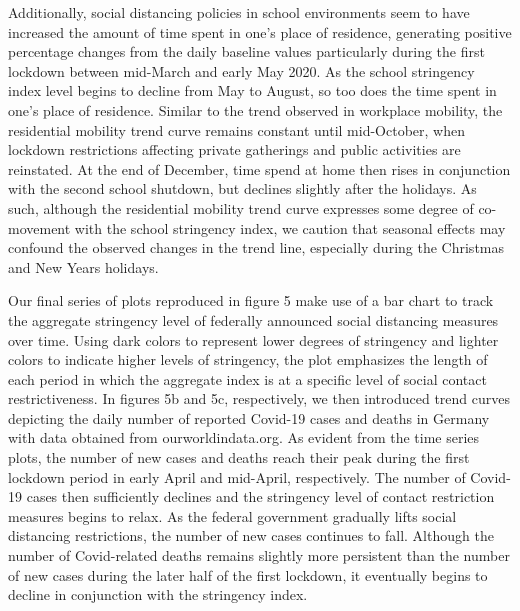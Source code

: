Additionally, social distancing policies in school environments seem to have increased the amount of time spent in one’s place of residence, generating positive percentage changes from the daily baseline values particularly during the first lockdown between mid-March and early May 2020. As the school stringency index level begins to decline from May to August, so too does the time spent in one’s place of residence. Similar to the trend observed in workplace mobility, the residential mobility trend curve remains constant until mid-October, when lockdown restrictions affecting private gatherings and public activities are reinstated. At the end of December, time spend at home then rises in conjunction with the second school shutdown, but declines slightly after the holidays. As such, although the residential mobility trend curve expresses some degree of co-movement with the school stringency index, we caution that seasonal effects may confound the observed changes in the trend line, especially during the Christmas and New Years holidays.

Our final series of plots reproduced in figure 5 make use of a bar chart to track the aggregate stringency level of federally announced social distancing measures over time. Using dark colors to represent lower degrees of stringency and lighter colors to indicate higher levels of stringency, the plot emphasizes the length of each period in which the aggregate index is at a specific level of social contact restrictiveness. In figures 5b and 5c, respectively, we then introduced trend curves depicting the daily number of reported Covid-19 cases and deaths in Germany with data obtained from ourworldindata.org. As evident from the time series plots, the number of new cases and deaths reach their peak during the first lockdown period in early April and mid-April, respectively. The number of Covid-19 cases then sufficiently declines and the stringency level of contact restriction measures begins to relax. As the federal government gradually lifts social distancing restrictions, the number of new cases continues to fall. Although the number of Covid-related deaths remains slightly more persistent than the number of new cases during the later half of the first lockdown, it eventually begins to decline in conjunction with the stringency index.


